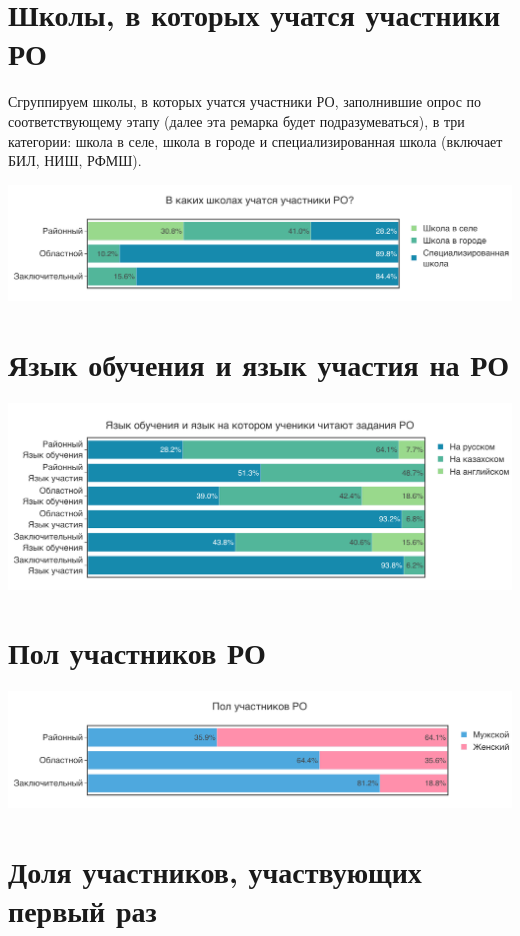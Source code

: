 \section{Школы, в которых учатся участники РО}
Сгруппируем школы, в которых учатся участники РО, заполнившие опрос по соответствующему этапу (далее эта ремарка будет подразумеваться), в три категории: школа в селе, школа в городе и специализированная школа (включает БИЛ, НИШ, РФМШ).

\includegraphics[width=\linewidth]{../export/pdf/demographics/schools.pdf}

\section{Язык обучения и язык участия на РО}

\includegraphics[width=\linewidth]{../export/pdf/demographics/language.pdf}

\section{Пол участников РО}

\includegraphics[width=\linewidth]{../export/pdf/demographics/gender.pdf}

\section{Доля участников, участвующих первый раз}

